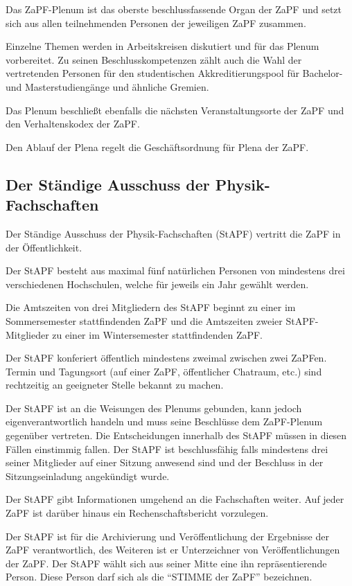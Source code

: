 \documentclass[
  a4paper,
  oneside]{scrartcl}
\begin{document}
Das ZaPF-Plenum ist das oberste beschlussfassende Organ der ZaPF und
setzt sich aus allen teilnehmenden Personen der jeweiligen ZaPF
zusammen.

Einzelne Themen werden in Arbeitskreisen diskutiert und für das Plenum
vorbereitet. Zu seinen Beschlusskompetenzen zählt auch die Wahl der
vertretenden Personen für den studentischen Akkreditierungspool für
Bachelor- und Masterstudiengänge und ähnliche Gremien.

Das Plenum beschließt ebenfalls die nächsten Veranstaltungsorte der ZaPF
und den Verhaltenskodex der ZaPF.

Den Ablauf der Plena regelt die Geschäftsordnung für Plena der ZaPF.

\subsection{Der Ständige Ausschuss der
Physik-Fachschaften}\label{der-stuxe4ndige-ausschuss-der-physik-fachschaften}

Der Ständige Ausschuss der Physik-Fachschaften (StAPF) vertritt die ZaPF
in der Öffentlichkeit.

Der StAPF besteht aus maximal fünf natürlichen Personen von mindestens
drei verschiedenen Hochschulen, welche für jeweils ein Jahr gewählt
werden.

Die Amtszeiten von drei Mitgliedern des StAPF beginnt zu einer im
Sommersemester stattfindenden ZaPF und die Amtszeiten zweier
StAPF-Mitglieder zu einer im Wintersemester stattfindenden ZaPF.

Der StAPF konferiert öffentlich mindestens zweimal zwischen zwei ZaPFen.
Termin und Tagungsort (auf einer ZaPF, öffentlicher Chatraum, etc.) sind
rechtzeitig an geeigneter Stelle bekannt zu machen.

Der StAPF ist an die Weisungen des Plenums gebunden, kann jedoch
eigenverantwortlich handeln und muss seine Beschlüsse dem ZaPF-Plenum
gegenüber vertreten. Die Entscheidungen innerhalb des StAPF müssen in
diesen Fällen einstimmig fallen. Der StAPF ist beschlussfähig falls
mindestens drei seiner Mitglieder auf einer Sitzung anwesend sind und
der Beschluss in der Sitzungseinladung angekündigt wurde.

Der StAPF gibt Informationen umgehend an die Fachschaften weiter. Auf
jeder ZaPF ist darüber hinaus ein Rechenschaftsbericht vorzulegen.

Der StAPF ist für die Archivierung und Veröffentlichung der Ergebnisse
der ZaPF verantwortlich, des Weiteren ist er Unterzeichner von
Veröffentlichungen der ZaPF. Der StAPF wählt sich aus seiner Mitte eine
ihn repräsentierende Person. Diese Person darf sich als die ``STIMME der
ZaPF'' bezeichnen.
\end{document}
